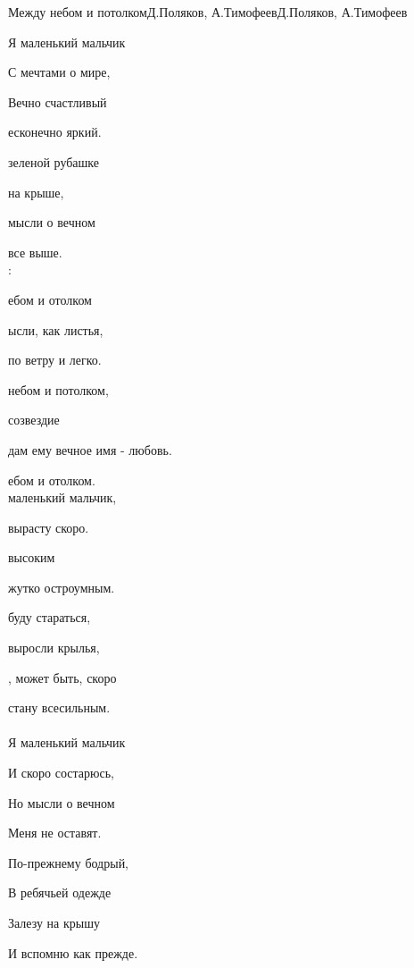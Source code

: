 \documentclass[11pt,a5paper]{book}
\renewcommand{\tt}{\indent \indent}
\begin{document}
\begin{song}{Между небом и потолком}{}{Д.Поляков, А.Тимофеев}{Д.Поляков, А.Тимофеев}{}{}

\tt{}Я маленький мальчик\par
\tt{}С мечтами о мире,\par
\tt{}Вечно счастливый\par
{} есконечно яркий.\par
{} зеленой рубашке\par
{} на крыше,\par
{} мысли о вечном\par
{} все выше.\\

:\par
\tt{} ебом и отолком\par
\tt{} ысли, как листья,\par
\tt{} по ветру и легко.\par
\tt{} небом и потолком,\par
\tt{} созвездие\par
\tt{} дам ему вечное имя - любовь.\par
\tt{} ебом и отолком. \\

 маленький мальчик,\par
{} вырасту скоро. \par
{} высоким\par
{} жутко остроумным.\par
{} буду стараться,\par
{} выросли крылья,\par
{}, может быть, скоро\par
{} стану всесильным.\\

\\

Я маленький мальчик\par
И скоро состарюсь,\par
Но мысли о вечном \par
Меня не оставят.\par
По-прежнему бодрый,\par
В ребячьей одежде \par
Залезу на крышу\par
И вспомню как прежде.\\


\end{song}
\end{document}
